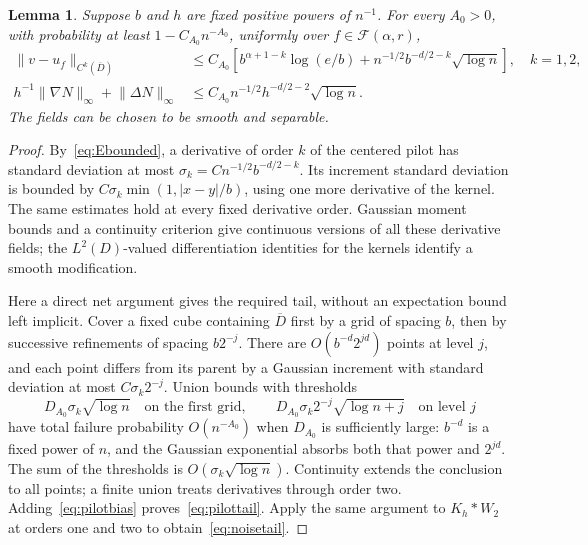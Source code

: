 \documentclass[11pt]{article}
\newtheorem{lemma}[theorem]{Lemma}
\theoremstyle{remark}
\newcommand{\cF}{\mathcal F}
\newcommand{\norm}[1]{\lVert #1\rVert}
\newcommand{\abs}[1]{\lvert #1\rvert}
\begin{document}
\begin{lemma}\label{lem:pilot}
Suppose $b$ and $h$ are fixed positive powers of $n^{-1}$. For every $A_0>0$, with probability at least $1-C_{A_0}n^{-A_0}$, uniformly over $f\in\cF(\alpha,r)$,
\begin{align}
 \norm{v-u_f}_{C^k(\overline D)}
 &\le C_{A_0}\left[b^{\alpha+1-k}\log(e/b)
       +n^{-1/2}b^{-d/2-k}\sqrt{\log n}\right],\quad k=1,2,
 \label{eq:pilottail}\\
 h^{-1}\norm{\nabla N}_\infty+\norm{\Delta N}_\infty
 &\le C_{A_0}n^{-1/2}h^{-d/2-2}\sqrt{\log n}.
 \label{eq:noisetail}
\end{align}
The fields can be chosen to be smooth and separable.
\end{lemma}
\begin{proof}
By~\eqref{eq:Ebounded}, a derivative of order $k$ of the centered pilot has standard deviation at most
$\sigma_k=Cn^{-1/2}b^{-d/2-k}$.
Its increment standard deviation is bounded by
$C\sigma_k\min(1,\abs{x-y}/b)$, using one more derivative of the kernel. The same estimates hold at every fixed derivative order. Gaussian moment bounds and a continuity criterion give continuous versions of all these derivative fields; the $L^2(D)$-valued differentiation identities for the kernels identify a smooth modification.

Here a direct net argument gives the required tail, without an expectation bound left implicit. Cover a fixed cube containing $\overline D$ first by a grid of spacing $b$, then by successive refinements of spacing $b2^{-j}$. There are $O(b^{-d}2^{jd})$ points at level $j$, and each point differs from its parent by a Gaussian increment with standard deviation at most $C\sigma_k2^{-j}$. Union bounds with thresholds
\[
 D_{A_0}\sigma_k\sqrt{\log n}\quad\text{on the first grid},\qquad
 D_{A_0}\sigma_k2^{-j}\sqrt{\log n+j}\quad\text{on level }j
\]
have total failure probability $O(n^{-A_0})$ when $D_{A_0}$ is sufficiently large: $b^{-d}$ is a fixed power of $n$, and the Gaussian exponential absorbs both that power and $2^{jd}$. The sum of the thresholds is $O(\sigma_k\sqrt{\log n})$. Continuity extends the conclusion to all points; a finite union treats derivatives through order two. Adding~\eqref{eq:pilotbias} proves~\eqref{eq:pilottail}. Apply the same argument to $K_h*W_2$ at orders one and two to obtain~\eqref{eq:noisetail}. 
\end{proof}
\end{document}

